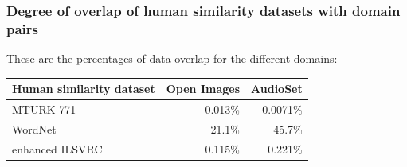 \subsubsection{Degree of overlap of human similarity datasets with domain pairs}

These are the percentages of data overlap for the different domains:

\begin{table}[H]
\centering
\begin{tabular}{lrr}
\toprule
{Human similarity dataset} &  Open Images &   AudioSet\\
\midrule
MTURK-771    &     0.013\% &  0.0071\%  \\
WordNet    &     21.1\% &  45.7\%  \\
enhanced ILSVRC    &    0.115\% &  0.221\% \\
\bottomrule
\end{tabular}
\centering
\end{table}

